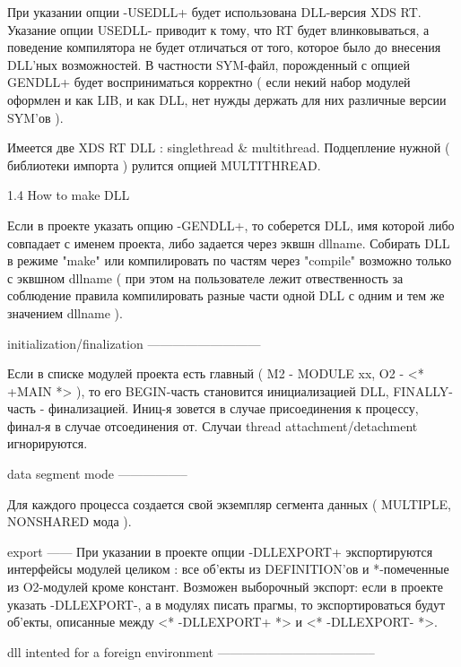           При указании опции -USEDLL+ будет использована DLL-версия XDS RT.
          Указание опции USEDLL- приводит к тому, что RT будет влинковываться, а поведение
          компилятора не будет отличаться от того, которое было до внесения DLL'ных возможностей.
          В частности SYM-файл, порожденный с опцией GENDLL+ будет восприниматься корректно
          ( если некий набор модулей оформлен и как LIB, и как DLL, нет нужды держать для них
            различные версии SYM'ов ).

            Имеется две XDS RT DLL : singlethread & multithread. Подцепление нужной
          ( библиотеки импорта ) рулится опцией MULTITHREAD.


      1.4 How to make DLL

          Если в проекте указать опцию -GENDLL+, то соберется DLL, имя которой либо
          совпадает с именем проекта, либо задается через эквшн dllname. Собирать
          DLL в режиме "make" или компилировать по частям через "compile" возможно
          только с эквшном dllname ( при этом на пользователе лежит отвественность за
          соблюдение правила компилировать разные части одной DLL с одним и тем же
          значением dllname ).

          initialization/finalization
          ---------------------------

          Если в списке модулей проекта есть главный ( M2 - MODULE xx, O2 - <* +MAIN *> ),
          то его BEGIN-часть становится инициализацией DLL, FINALLY-часть - финализацией.
          Иниц-я зовется в случае присоединения к процессу, финал-я в случае отсоединения
          от. Случаи thread attachment/detachment игнорируются.

          data segment mode
          -----------------

          Для каждого процесса создается свой экземпляр сегмента данных ( MULTIPLE,
          NONSHARED мода ).


          export
          ------
          При указании в проекте опции -DLLEXPORT+ экспортируются интерфейсы модулей
          целиком : все об'екты из DEFINITION'ов и *-помеченные из O2-модулей кроме
          констант. Возможен выборочный экспорт: если в проекте указать -DLLEXPORT-,
          а в модулях писать прагмы, то экспортироваться будут об'екты, описанные
          между <* -DLLEXPORT+ *> и <* -DLLEXPORT- *>.


          dll intented for a foreign environment
          --------------------------------------

